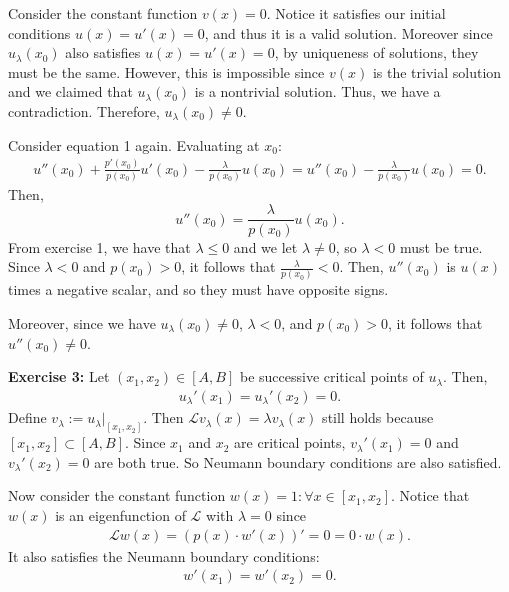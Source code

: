 \documentclass[12pt]{article}
\begin{document}
Consider the constant function $v(x) = 0$.
Notice it satisfies our initial conditions $u(x) = u'(x) = 0$, and thus it is a valid solution.
Moreover since $u_\lambda(x_0)$ also satisfies $u(x) = u'(x) = 0$, by uniqueness of solutions, they must be the same.
However, this is impossible since $v(x)$ is the trivial solution and we claimed that $u_\lambda(x_0)$ is a nontrivial solution.
Thus, we have a contradiction.
Therefore, $u_\lambda(x_0) \neq 0$.

Consider equation 1 again. Evaluating at $x_0$:
\begin{align*}
    u''(x_0) + \frac{p'(x_0)}{p(x_0)}u'(x_0) - \frac{\lambda}{p(x_0)}u(x_0) = u''(x_0) - \frac{\lambda}{p(x_0)}u(x_0) = 0.
\end{align*}
Then,
\begin{equation*}
    u''(x_0) = \frac{\lambda}{p(x_0)}u(x_0).
\end{equation*}
From exercise 1, we have that $\lambda \leq 0$ and we let $\lambda \neq 0$, so $\lambda < 0$ must be true.
Since $\lambda < 0$ and $p(x_0) > 0$, it follows that $\frac{\lambda}{p(x_0)} < 0$.
Then, $u''(x_0)$ is $u(x)$ times a negative scalar, and so they must have opposite signs.

Moreover, since we have $u_\lambda(x_0) \neq 0$, $\lambda < 0$, and $p(x_0) > 0$, it follows that $u''(x_0) \neq 0$.

\vspace{5ex}

\noindent{}\textbf{Exercise 3:}
Let $(x_1, x_2) \in [A, B]$ be successive critical points of $u_\lambda$.
Then,
\begin{align*}
    u_\lambda'(x_1) = u_\lambda'(x_2) = 0.
\end{align*}
Define $v_\lambda := u_\lambda |_{[x_1, x_2]}$.
Then $\mathcal{L}v_\lambda(x) = \lambda v_\lambda(x)$ still holds because $[x_1, x_2] \subset [A, B]$.
Since $x_1$ and $x_2$ are critical points, $v_\lambda'(x_1) = 0$ and $v_\lambda'(x_2) = 0$ are both true.
So Neumann boundary conditions are also satisfied.

Now consider the constant function $w(x) = 1 : \forall x \in [x_1, x_2]$.
Notice that $w(x)$ is an eigenfunction of $\mathcal{L}$ with $\lambda = 0$ since
\begin{align*}
    \mathcal{L}w(x) = (p(x) \cdot w'(x))' = 0 = 0 \cdot w(x).
\end{align*}
It also satisfies the Neumann boundary conditions:
\begin{align*}
    w'(x_1) = w'(x_2) = 0.
\end{align*}
\end{document}
